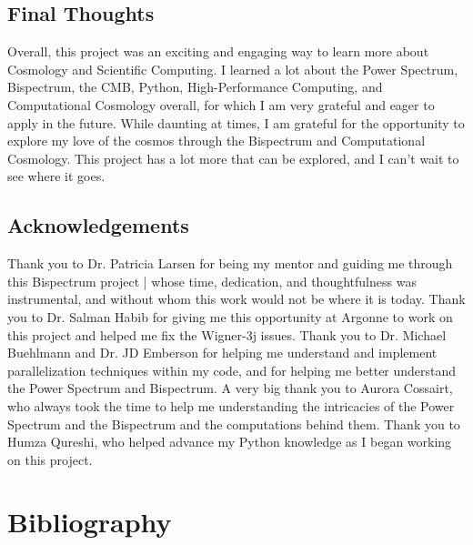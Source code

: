\documentclass[11pt]{article}
\renewcommand{\_}[1]{\underline{ #1 }}
\begin{document}
{\subsection{Final Thoughts}\label{finalthoughts}

Overall, this project was an exciting and engaging way to learn more about Cosmology and Scientific Computing. I learned a lot about the Power Spectrum, Bispectrum, the CMB, Python, High-Performance Computing, and Computational Cosmology overall, for which I am very grateful and eager to apply in the future. While daunting at times, I am grateful for the opportunity to explore my love of the cosmos through the Bispectrum and Computational Cosmology. This project has a lot more that can be explored, and I can't wait to see where it goes.

\subsection{Acknowledgements}\label{acknowledgements}

Thank you to Dr. Patricia Larsen for being my mentor and guiding me through this Bispectrum project | whose time, dedication, and thoughtfulness was instrumental, and without whom this work would not be where it is today. Thank you to Dr. Salman Habib for giving me this opportunity at Argonne to work on this project and helped me fix the Wigner-3j issues. Thank you to Dr. Michael Buehlmann and Dr. JD Emberson for helping me understand and implement parallelization techniques within my code, and for helping me better understand the Power Spectrum and Bispectrum. A very big thank you to Aurora Cossairt, who always took the time to help me understanding the intricacies of the Power Spectrum and the Bispectrum and the computations behind them. Thank you to Humza Qureshi, who helped advance my Python knowledge as I began working on this project.

\section{Bibliography}



}
\end{document}
